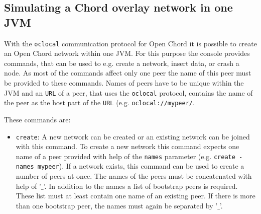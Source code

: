 \subsection{Simulating a Chord overlay network in one JVM}\label{localcom}
With the {\tt oclocal} communication protocol for Open Chord it is possible 
to create an Open Chord network within one JVM. For this purpose the console 
provides commands, that can be used to e.g. create a network, insert data, or 
crash a node. As most of the commands affect only one peer the name of this peer 
must be provided to these commands. Names of peers have to be unique within 
the JVM and an {\tt URL} of a peer, that uses the {\tt oclocal} protocol, 
contains the name of the peer as the host part of the {\tt URL} (e.g. {\tt oclocal://mypeer/}. 

These commands are: 
\begin{itemize}
%
\item {\tt create}: A new network can be created or 
an existing network can be joined with this command. 
To create a new network this command 
expects one name of a peer provided with help of the {\tt names} parameter
(e.g. {\tt create -names mypeer}). If a network exists, this command can 
be used to create a number of peers at once. The names of the peers must 
be concatenated with help of '{\tt $\_$}'. In addition to the names 
a list of bootstrap peers is required. These list must at least contain 
one name of an existing peer. If there is more than one bootstrap peer, 
the names must again be separated by '{\tt $\_$}'. 


\end{itemize}
